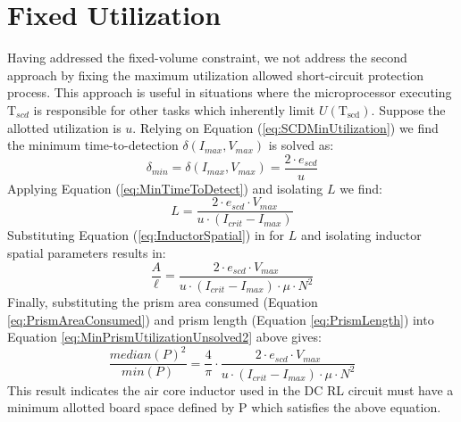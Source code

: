 \documentclass[11pt,oneside]{report}
\begin{document}
    \section{Fixed Utilization}
    Having addressed the fixed-volume constraint, we not address the second approach by fixing the maximum utilization allowed short-circuit protection process.
    This approach is useful in situations where the microprocessor executing $\mathrm{T}_{scd}$ is responsible for other tasks which inherently limit $U(\mathrm{T_{scd}})$. Suppose the allotted utilization is $u$. Relying on Equation (\ref{eq:SCDMinUtilization}) we find the minimum time-to-detection $\delta(I_{max},V_{max})$ is solved as:
    \begin{equation}\label{eq:MinTimeToDetectSpatial}
    \delta_{min} = \delta(I_{max},V_{max}) = \frac{2 \cdot e_{scd}}{u} \nonumber
    \end{equation}
    Applying Equation (\ref{eq:MinTimeToDetect}) and isolating $L$ we find:
    \begin{equation}\label{eq:InductorFixedUtilization}
    L = \frac{2 \cdot e_{scd} \cdot V_{max}}{u \cdot (I_{crit}-I_{max})} \nonumber
    \end{equation}
    Substituting Equation (\ref{eq:InductorSpatial}) in for $L$ 
    and isolating inductor spatial parameters results in:
    \begin{equation}\label{eq:MinPrismUtilizationUnsolved2}
    \frac{A}{\ell} = \frac{2 \cdot e_{scd} \cdot V_{max}}{u \cdot (I_{crit}-I_{max}) \cdot \mu \cdot N^{2}} \nonumber
    \end{equation}
    Finally, substituting the prism area consumed (Equation \ref{eq:PrismAreaConsumed}) and prism length (Equation \ref{eq:PrismLength}) into Equation \ref{eq:MinPrismUtilizationUnsolved2} above gives:
    \begin{equation}\label{eq:MinPrismUtilization}
    \frac{median(P)^{2}}{min(P)} = \frac{4}{\pi} \cdot \frac{ 2 \cdot e_{scd} \cdot V_{max}}{u \cdot (I_{crit}-I_{max}) \cdot \mu \cdot N^{2}}
    \end{equation}
    This result indicates the air core inductor used in the DC RL circuit must have a minimum allotted board space defined by P which satisfies the above equation.
    
\end{document}
